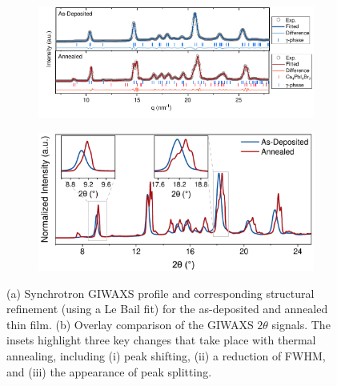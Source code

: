\begin{figure}[htbp]
    \centering
    \begin{subfigure}[b]{\textwidth}
    \centering
        \includegraphics[width=0.85\linewidth]{chapters/material_properties/images/GIWAXS_Before_After.pdf}
        \caption{}
        \label{fig:ch2:giwaxs_before_after:model}
    \end{subfigure}

    \vspace{0.5cm}
    
    \begin{subfigure}[b]{\textwidth}
    \centering
    \hspace{-1.4cm}
        \includegraphics[width=0.68\linewidth]{chapters/material_properties/images/giwaxs_overlayed.pdf}
        \caption{}
        \label{fig:ch2:giwaxs_before_after:overlay}
    \end{subfigure}
    
    \caption{(a) Synchrotron GIWAXS profile and corresponding structural refinement (using a Le Bail fit) for the as-deposited and annealed  thin film. (b) Overlay comparison of the GIWAXS $2\theta$ signals. The insets highlight three key changes that take place with thermal annealing, including (i) peak shifting, (ii) a reduction of FWHM, and (iii) the appearance of peak splitting. 
}
    \label{fig:ch2:giwaxs_before_after:}
\end{figure}



